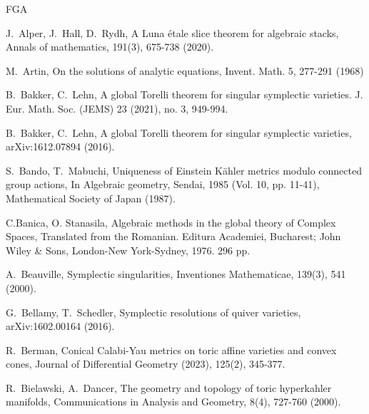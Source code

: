 \documentclass[12pt,a4paper]{amsart}
\theoremstyle{remark}
\theoremstyle{definition}
\begin{document}


\begin{thebibliography}{FGA}

J.~Alper, J.~Hall, D.~Rydh, 
A Luna \'etale slice theorem for algebraic stacks, 
Annals of mathematics, 191(3), 675-738 (2020). 

M.~Artin, On the solutions of analytic equations, Invent. Math. 5, 277-291 (1968)

 B.~Bakker, C.~Lehn,  A global Torelli theorem for singular symplectic varieties. J. Eur. Math. Soc. (JEMS) 23 (2021), no. 3, 949-994.

 B.~Bakker, C.~Lehn,  A global Torelli theorem for singular symplectic varieties, 
arXiv:1612.07894 (2016). 

S.~Bando, T.~Mabuchi, 
Uniqueness of Einstein K\"ahler metrics modulo connected group actions, 
In Algebraic geometry, Sendai, 1985 (Vol. 10, pp. 11-41), 
Mathematical Society of Japan (1987). 

C.Banica, O. Stanasila, Algebraic methods in the global theory of Complex Spaces, 
Translated from the Romanian. Editura Academiei, Bucharest; John Wiley \& Sons, London-New York-Sydney, 1976. 296 pp.


A.~Beauville, Symplectic singularities, 
Inventiones Mathematicae, 139(3), 541 (2000). 

G.~Bellamy, T.~Schedler, 
Symplectic resolutions of quiver varieties, arXiv:1602.00164 (2016). 

R.~Berman, Conical Calabi-Yau metrics on toric affine varieties and convex cones, Journal of Differential Geometry (2023), 125(2), 345-377. 

R.~Bielawski, A.~Dancer, 
The geometry and topology of toric hyperkahler manifolds, 
Communications in Analysis and Geometry, 8(4), 727-760 (2000). 


\end{thebibliography}
\end{document}
